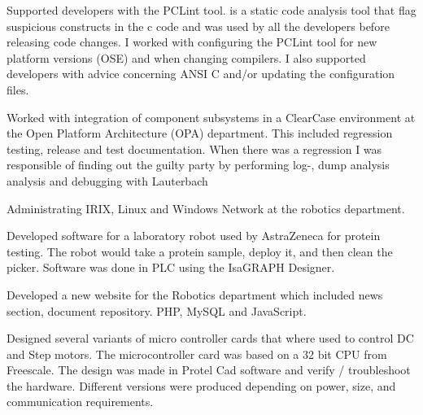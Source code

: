 \documentclass{article}
\begin{document}
  {Supported developers with the PCLint tool. is a static code analysis tool
    that flag suspicious constructs in the c code and was used by all the
    developers before releasing code changes. I worked with configuring the
    PCLint tool for new platform versions (OSE) and when changing compilers. I
    also supported developers with advice concerning ANSI C and/or updating the
    configuration files. 
  }
\sepspace

  {Worked with integration of component subsystems in a ClearCase environment
    at the Open Platform Architecture (OPA) department. This included
    regression testing, release and test documentation.  When there was a
    regression I was responsible of finding out the guilty party by performing
    log-, dump analysis analysis and debugging with Lauterbach}
\sepspace

\sepspace

  {Administrating IRIX, Linux and Windows Network at the robotics department.}
\sepspace

  {Developed software for a laboratory robot used by AstraZeneca for protein testing. 
  The robot would take a protein sample, deploy it, and then clean the picker. 
  Software was done in PLC using the IsaGRAPH Designer.}
\sepspace

  {Developed a new website for the Robotics department which included news
    section, document repository.  PHP, MySQL and JavaScript.} 
\sepspace

{Designed several variants of micro controller cards that where used to control
  DC and Step motors. The microcontroller card was based on a 32 bit CPU from
  Freescale. The design was made in Protel Cad software and verify /
  troubleshoot the hardware. Different versions were produced depending
  on power, size, and communication requirements.
}
\sepspace
\end{document}
